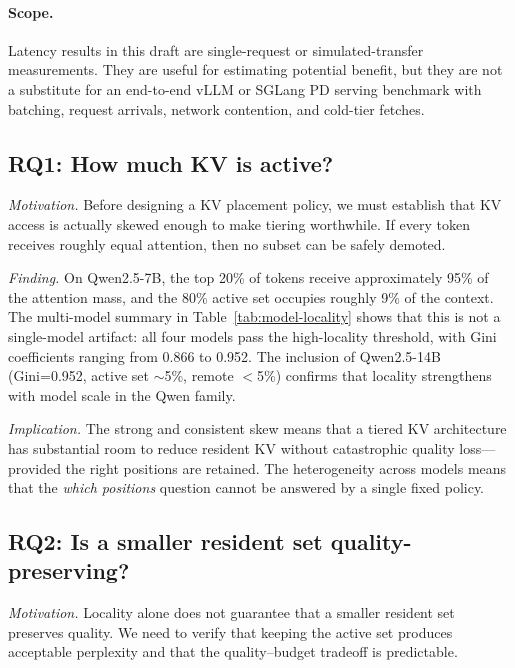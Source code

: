 \documentclass[11pt]{article}
\newcommand{\pct}{\%}
\theoremstyle{definition}
\theoremstyle{plain}
\begin{document}
\paragraph{Scope.}
Latency results in this draft are single-request or simulated-transfer measurements.  They are useful for estimating potential benefit, but they are not a substitute for an end-to-end vLLM or SGLang PD serving benchmark with batching, request arrivals, network contention, and cold-tier fetches.

\subsection{RQ1: How much KV is active?}
\label{sec:rq1}

\emph{Motivation.}  Before designing a KV placement policy, we must establish that KV access is actually skewed enough to make tiering worthwhile.  If every token receives roughly equal attention, then no subset can be safely demoted.

\emph{Finding.}  On Qwen2.5-7B, the top 20\pct{} of tokens receive approximately 95\pct{} of the attention mass, and the 80\pct{} active set occupies roughly 9\pct{} of the context.  The multi-model summary in Table~\ref{tab:model-locality} shows that this is not a single-model artifact: all four models pass the high-locality threshold, with Gini coefficients ranging from 0.866 to 0.952.  The inclusion of Qwen2.5-14B (Gini=0.952, active set $\sim$5\pct{}, remote $<$5\pct{}) confirms that locality strengthens with model scale in the Qwen family.

\emph{Implication.}  The strong and consistent skew means that a tiered KV architecture has substantial room to reduce resident KV without catastrophic quality loss---provided the right positions are retained.  The heterogeneity across models means that the \emph{which positions} question cannot be answered by a single fixed policy.

\subsection{RQ2: Is a smaller resident set quality-preserving?}
\label{sec:rq2}

\emph{Motivation.}  Locality alone does not guarantee that a smaller resident set preserves quality.  We need to verify that keeping the active set produces acceptable perplexity and that the quality--budget tradeoff is predictable.
\end{document}
